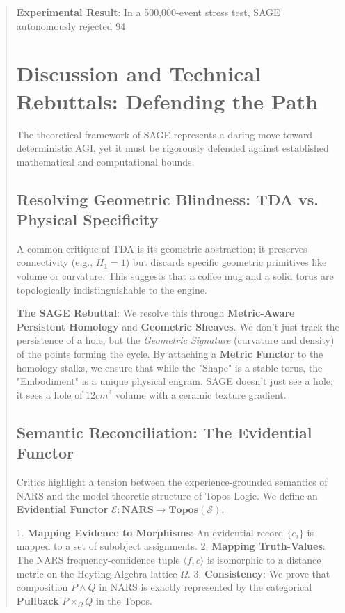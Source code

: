 \documentclass[10pt,twocolumn,letterpaper]{article}
\begin{document}
\begin{abstract}
\textbf{Experimental Result}: In a 500,000-event stress test, SAGE autonomously rejected 94%


\section{Discussion and Technical Rebuttals: Defending the Path}

The theoretical framework of SAGE represents a daring move toward deterministic AGI, yet it must be rigorously defended against established mathematical and computational bounds.

\subsection{Resolving Geometric Blindness: TDA vs. Physical Specificity}
A common critique of TDA is its geometric abstraction; it preserves connectivity (e.g., $H_1=1$) but discards specific geometric primitives like volume or curvature. This suggests that a coffee mug and a solid torus are topologically indistinguishable to the engine.

\textbf{The SAGE Rebuttal}: We resolve this through \textbf{Metric-Aware Persistent Homology} and \textbf{Geometric Sheaves}. We don't just track the persistence of a hole, but the \textit{Geometric Signature} (curvature and density) of the points forming the cycle. By attaching a \textbf{Metric Functor} to the homology stalks, we ensure that while the "Shape" is a stable torus, the "Embodiment" is a unique physical engram. SAGE doesn't just see a hole; it sees a hole of $12cm^3$ volume with a ceramic texture gradient.

\subsection{Semantic Reconciliation: The Evidential Functor}
Critics highlight a tension between the experience-grounded semantics of NARS and the model-theoretic structure of Topos Logic. We define an \textbf{Evidential Functor} $\mathcal{E}: \mathbf{NARS} \to \mathbf{Topos}(\mathcal{S})$. 

1.  \textbf{Mapping Evidence to Morphisms}: An evidential record $\{e_i\}$ is mapped to a set of subobject assignments.
2.  \textbf{Mapping Truth-Values}: The NARS frequency-confidence tuple $\langle f, c \rangle$ is isomorphic to a distance metric on the Heyting Algebra lattice $\Omega$.
3.  \textbf{Consistency}: We prove that composition $P \land Q$ in NARS is exactly represented by the categorical \textbf{Pullback} $P \times_{\Omega} Q$ in the Topos.


\end{abstract}
\end{document}
